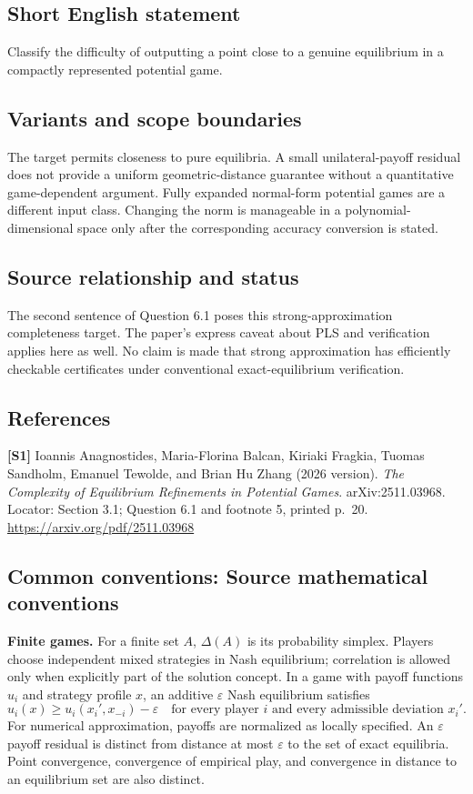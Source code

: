 \documentclass[11pt,a4paper]{article}
\begin{document}
\subsection*{Short English statement}
Classify the difficulty of outputting a point close to a genuine equilibrium in a compactly represented potential game.
\subsection*{Variants and scope boundaries}
The target permits closeness to pure equilibria. A small unilateral-payoff residual does not provide a uniform geometric-distance guarantee without a quantitative game-dependent argument. Fully expanded normal-form potential games are a different input class. Changing the norm is manageable in a polynomial-dimensional space only after the corresponding accuracy conversion is stated.
\subsection*{Source relationship and status}
The second sentence of Question 6.1 poses this strong-approximation completeness target. The paper's express caveat about PLS and verification applies here as well. No claim is made that strong approximation has efficiently checkable certificates under conventional exact-equilibrium verification.
\subsection*{References}
\begingroup\footnotesize\raggedright
{\footnotesize\raggedright
\textbf{[S1]} Ioannis Anagnostides, Maria-Florina Balcan, Kiriaki Fragkia, Tuomas Sandholm, Emanuel Tewolde, and Brian Hu Zhang (2026 version). \emph{The Complexity of Equilibrium Refinements in Potential Games}. arXiv:2511.03968. Locator: Section 3.1; Question 6.1 and footnote 5, printed p.\ 20. \url{https://arxiv.org/pdf/2511.03968}\par}
\par\endgroup

\subsection*{Common conventions: Source mathematical conventions}

\textbf{Finite games.} For a finite set $A$, $\Delta(A)$ is its probability
simplex. Players choose independent mixed strategies in Nash equilibrium;
correlation is allowed only when explicitly part of the solution concept.
In a game with payoff functions $u_i$ and strategy profile $x$, an additive
$\varepsilon$ Nash equilibrium satisfies
\[
 u_i(x)\geq u_i(x_i',x_{-i})-\varepsilon
 \quad\text{for every player $i$ and every admissible deviation $x_i'$}.
\]
For numerical approximation, payoffs are normalized as locally specified.
An $\varepsilon$ payoff residual is distinct from distance at most
$\varepsilon$ to the set of exact equilibria. Point convergence, convergence
of empirical play, and convergence in distance to an equilibrium set are
also distinct.
\end{document}
